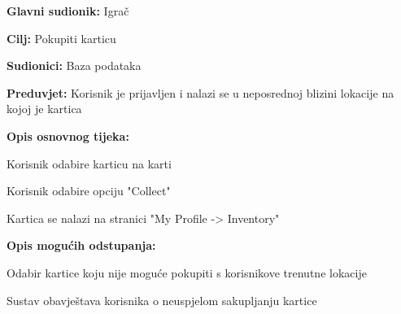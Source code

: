 					\noindent {}
					\begin{packed_item}
	
						\item \textbf{Glavni sudionik: }Igrač
						\item  \textbf{Cilj:} Pokupiti karticu
						\item  \textbf{Sudionici:} Baza podataka
						\item  \textbf{Preduvjet:} Korisnik je prijavljen i nalazi se u neposrednoj blizini lokacije na kojoj je kartica
						\item  \textbf{Opis osnovnog tijeka:}
						
						\item[] \begin{packed_enum}
	
							\item Korisnik odabire karticu na karti
							\item Korisnik odabire opciju "Collect"
							\item Kartica se nalazi na stranici "My Profile -> Inventory" 

						\end{packed_enum}
						
						\item  \textbf{Opis mogućih odstupanja:}
						
						\item[] \begin{packed_item}
	
							\item[2.a] Odabir kartice koju nije moguće pokupiti s korisnikove trenutne lokacije
							\item[] \begin{packed_enum}
								
								\item Sustav obavještava korisnika o neuspjelom sakupljanju kartice
								
							\end{packed_enum}
							
						\end{packed_item}
					\end{packed_item}
					
